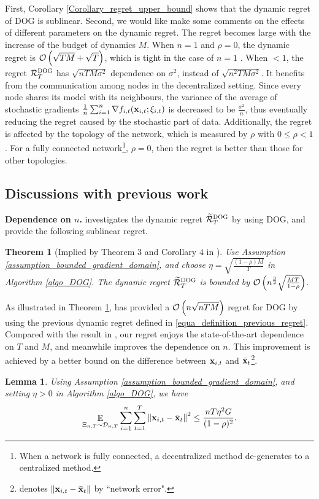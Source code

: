 \documentclass{article}
\newtheorem{Theorem}{\bf{Theorem}}
\newtheorem{Lemma}{\bf{Lemma}}
\begin{document}
First, Corollary \ref{Corollary_regret_upper_bound} shows that the dynamic regret of DOG is sublinear. Second, we would like make some comments on the effects of different parameters on the dynamic regret. The regret becomes large with the increase of the budget of dynamics $M$. When $n=1$ and $\rho =0$, the dynamic regret is ${\mathcal{O}\left( \sqrt{TM}+\sqrt{T} \right)}$, which is tight in the case of $n=1$ \citep{Zhao:2018wx}. When $ <1$, the regret ${\mathcal{R}}_T^{\textsc{DOG}}$ has $\sqrt{nTM\sigma^2}$ dependence on $\sigma^2$, instead of $\sqrt{n^2TM\sigma^2}$. It benefits from the communication among nodes in the decentralized setting. Since every node shares its model with its neighbours, the variance of the average of stochastic gradients $\frac{1}{n}\sum_{i=1}^n\nabla f_{i,t}({\bf x}_{i,t};\xi_{i,t})$ is decreased to be $\frac{\sigma^2}{n}$, thus eventually reducing the regret caused by the stochastic part of data.   Additionally, the regret is affected by the topology of the network, which is measured by $\rho$ with $0\le \rho < 1$. For a fully connected network\footnote{When a network is fully connected, a decentralized method de-generates to a centralized method.}, $\rho = 0$, then the regret is better than those for other topologies. 




\subsection{Discussions with previous work}

\textbf{Dependence on $n$.}  \citet{8015179Shahram} investigates the dynamic regret $\widetilde{{\mathcal{R}}}_T^{\textsc{DOG}}$ by using DOG, and provide the following sublinear regret.
\begin{Theorem}[Implied by Theorem $3$ and Corollary $4$ in \citet{8015179Shahram}]
\label{theorem_privious_dog_regret}
Use Assumption \ref{assumption_bounded_gradient_domain}, and choose $\eta = \sqrt{\frac{(1-\rho) M}{T}}$ in Algorithm \ref{algo_DOG}. The dynamic regret $\widetilde{{\mathcal{R}}}_T^{\textsc{DOG}}$ is bounded by ${\mathcal{O}\left( n^{\frac{3}{2}}\sqrt{\frac{MT}{1-\rho}}  \right)}$.
\end{Theorem}

As illustrated in Theorem \ref{theorem_privious_dog_regret},   \citet{8015179Shahram} has provided a ${\mathcal{O}\left( n\sqrt{nTM} \right)}$ regret for DOG by using the previous dynamic regret defined in \eqref{equa_definition_previous_regret}.  Compared with the result in \citet{8015179Shahram}, our regret enjoys the state-of-the-art dependence on $T$ and $M$, and meanwhile improves the dependence on $n$. This improvement is achieved by a better bound on the difference between ${\bf x}_{i,t}$ and $\bar{{\bf x}}_t$\footnote{\citet{8015179Shahram} denotes $\left\lVert{\bf x}_{i,t} - \bar{{\bf x}}_t\right\rVert$ by ``network error".}.
\begin{Lemma}
\label{Lemma_x_variance_norm_square}
Using Assumption \ref{assumption_bounded_gradient_domain}, and setting $\eta>0$ in Algorithm \ref{algo_DOG}, we have 
\begin{align}
\nonumber
\mathop{\mathbb{E}}_{ \Xi_{n,T} \sim \mathcal{D}_{n,T} } \sum_{i=1}^n\sum_{t=1}^T \left\lVert{\bf x}_{i,t} - \bar{{\bf x}}_t\right\rVert^2 \le \frac{nT\eta^2 G }{(1-\rho)^2}.
\end{align}
\end{Lemma}
\end{document}
